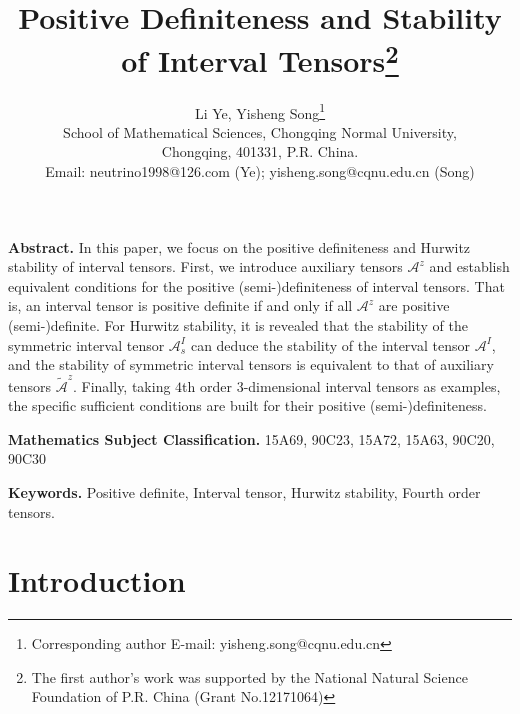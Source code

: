 \documentclass[twoside]{article}
\begin{document}
\title{\bf Positive Definiteness and Stability of Interval Tensors\thanks{The first author's work was supported by the National Natural Science Foundation of P.R. China (Grant No.12171064)}}
\date{}
\author{ Li Ye, Yisheng Song\thanks{Corresponding author E-mail: yisheng.song@cqnu.edu.cn}\\
	School of Mathematical Sciences,  Chongqing Normal University, \\
	Chongqing, 401331, P.R. China. \\ Email: neutrino1998@126.com (Ye); yisheng.song@cqnu.edu.cn (Song)}
\maketitle

{\noindent\bf Abstract.} In this paper, we focus on the positive definiteness and Hurwitz stability of interval tensors. First, we introduce auxiliary tensors $\mathcal{A}^z$ and establish  equivalent conditions for the positive (semi-)definiteness of interval tensors. That is, an interval tensor is positive definite if and only if all $\mathcal{A}^z$ are positive (semi-)definite. For Hurwitz stability, it is revealed that the stability of the symmetric interval tensor $\mathcal{A}_s^I$ can deduce the stability of the interval tensor $\mathcal{A}^I$, and the stability of symmetric interval tensors is equivalent to that of auxiliary tensors $\tilde{\mathcal{A}}^z$. Finally, taking $4$th order $3$-dimensional interval tensors as examples, the specific sufficient conditions are  built for their positive (semi-)definiteness.

\vspace{.3cm}
{\noindent\bf Mathematics Subject Classification.} 15A69, 90C23, 15A72, 15A63, 90C20, 90C30
\vspace{.3cm}

{\noindent\bf Keywords.} Positive definite, Interval tensor, Hurwitz stability, Fourth order tensors.

\section{Introduction}
\setcounter{section}{1}
\end{document}
